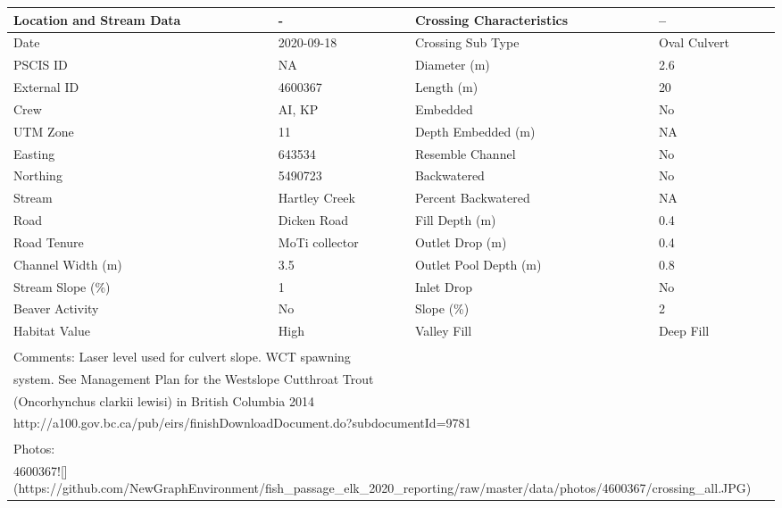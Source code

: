 \documentclass[
]{book}
\begin{document}
\begin{tabular}{l|l|l|l}
\hline
Location and Stream Data & - & Crossing Characteristics & --\\
\hline
Date & 2020-09-18 & Crossing Sub Type & Oval Culvert\\
\hline
PSCIS ID & NA & Diameter (m) & 2.6\\
\hline
External ID & 4600367 & Length (m) & 20\\
\hline
Crew & AI, KP & Embedded & No\\
\hline
UTM Zone & 11 & Depth Embedded (m) & NA\\
\hline
Easting & 643534 & Resemble Channel & No\\
\hline
Northing & 5490723 & Backwatered & No\\
\hline
Stream & Hartley Creek & Percent Backwatered & NA\\
\hline
Road & Dicken Road & Fill Depth (m) & 0.4\\
\hline
Road Tenure & MoTi collector & Outlet Drop (m) & 0.4\\
\hline
Channel Width (m) & 3.5 & Outlet Pool Depth (m) & 0.8\\
\hline
Stream Slope (\%) & 1 & Inlet Drop & No\\
\hline
Beaver Activity & No & Slope (\%) & 2\\
\hline
Habitat Value & High & Valley Fill & Deep Fill\\
\hline
\multicolumn{4}{l}{\textsuperscript{} Comments: Laser level used for culvert slope. WCT spawning}\\
\multicolumn{4}{l}{system. See Management Plan for the Westslope Cutthroat Trout}\\
\multicolumn{4}{l}{(Oncorhynchus clarkii lewisi) in British Columbia 2014}\\
\multicolumn{4}{l}{http://a100.gov.bc.ca/pub/eirs/finishDownloadDocument.do?subdocumentId=9781}\\
\multicolumn{4}{l}{\textsuperscript{} Photos:}\\
\multicolumn{4}{l}{4600367![](https://github.com/NewGraphEnvironment/fish\_passage\_elk\_2020\_reporting/raw/master/data/photos/4600367/crossing\_all.JPG)}\\
\end{tabular}
\end{document}
